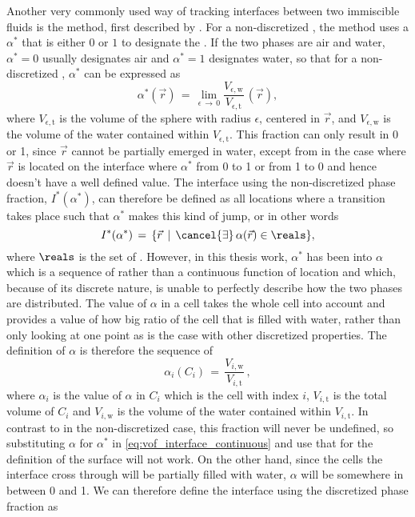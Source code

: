 Another very commonly used way of tracking interfaces between two immiscible fluids is the \VOF method, first described by \citet{Hirt1981}. For a non-discretized \PDE, the \VOF method uses a  $\alpha^*$ that is either $0$ or $1$ to designate the \phase. If the two phases are air and water, $\alpha^* = 0$ usually designates air and $\alpha^* = 1$ designates water, so that for a non-discretized \PDE, $\alpha^*$ can be expressed as
%
\begin{equation} \label{eq:phase_fraction_continuous}
\alpha^*(\vec{r}) \,=\, \lim_{\epsilon\,\rightarrow\,0} \frac{V_{\epsilon,\text{w}}}{V_{\epsilon,\text{t}}}\,(\vec{r}),
\end{equation}
%
where $V_{\epsilon,\text{t}}$ is the volume of the sphere with radius $\epsilon$, centered in $\vec{r}$, and $V_{\epsilon,\text{w}}$ is the volume of the water contained within $V_{\epsilon,\text{t}}$. This fraction can only result in 0 or 1, since $\vec{r}$ cannot be partially emerged in water, except from in the case where $\vec{r}$ is located on the interface where $\alpha^*$  from 0 to 1 or from 1 to 0 and hence doesn't have a well defined value. The interface using the non-discretized phase fraction, $I^*(\alpha^*)$, can therefore be defined as all locations where a transition takes place such that $\alpha^*$ makes this kind of jump, or in other words
%
\begin{equation} \label{eq:vof_interface_continuous}
I^*(\alpha^*) \,=\, \{\vec{r} \,\mid\, \cancel{\exists}\,\alpha(\vec{r})\in\reals\},
\end{equation}
%
where $\reals$ is the set of . However, in this thesis work, $\alpha^*$ has been \discretized into $\alpha$ which is a sequence of  rather than a continuous function of location and which, because of its discrete nature, is unable to perfectly describe how the two phases are distributed. The value of $\alpha$ in a cell takes the whole cell into account and provides a value of how big ratio of the cell that is filled with water, rather than only looking at one point as is the case with other discretized properties. The definition of $\alpha$ is therefore the sequence of
%
\begin{equation} \label{eq:phase_fraction_discretized}
\alpha_i(C_i) \,=\, \frac{V_{i,\text{w}}}{V_{i,\text{t}}}\,,
\end{equation}
%
where $\alpha_i$ is the value of $\alpha$ in $C_i$ which is the cell with index $i$, $V_{i,\text{t}}$ is the total volume of $C_i$ and $V_{i,\text{w}}$ is the volume of the water contained within $V_{i,\text{t}}$. In contrast to in the non-discretized case, this fraction will never be undefined, so substituting $\alpha$ for $\alpha^*$ in \eqref{eq:vof_interface_continuous} and use that for the definition of the surface will not work. On the other hand, since the cells the interface cross through will be partially filled with water, $\alpha$ will be somewhere in between 0 and 1. We can therefore define the interface using the discretized phase fraction as
